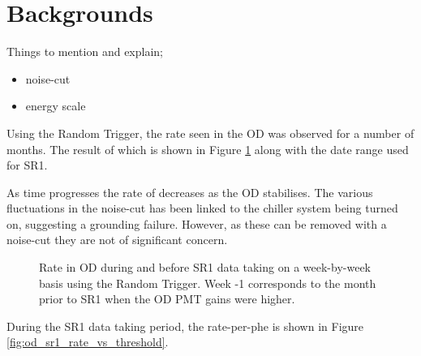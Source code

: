 \section{Backgrounds}
Things to mention and explain;
\begin{itemize}
    \item noise-cut
    \item energy scale
\end{itemize}

\par
Using the Random Trigger, the rate seen in the OD was observed for a number of months.
The result of which is shown in Figure \ref{fig:OD_SR1_Rate} along with the date range used for SR1.
\par
As time progresses the rate of decreases as the OD stabilises.
The various fluctuations in the noise-cut has been linked to the chiller system being turned on, suggesting a grounding failure.
However, as these can be removed with a noise-cut they are not of significant concern.
\begin{figure}[!htbp]
    \centering
    \caption{Rate in OD during and before SR1 data taking on a week-by-week basis using the Random Trigger.
    Week -1 corresponds to the month prior to SR1 when the OD PMT gains were higher.}
    \label{fig:OD_SR1_Rate}
\end{figure}
\par
During the SR1 data taking period, the rate-per-phe is shown in Figure \ref{fig:od_sr1_rate_vs_threshold}.
